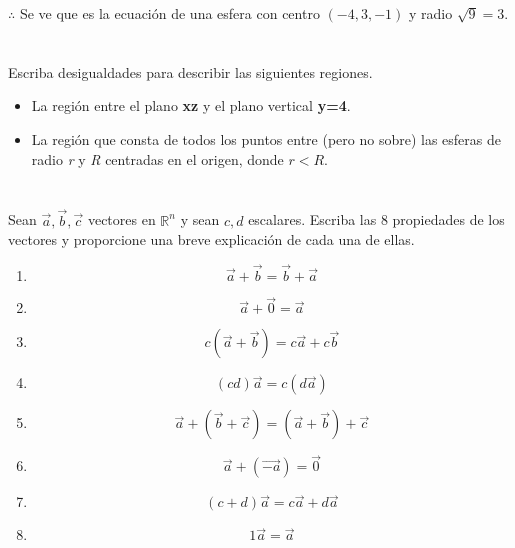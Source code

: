 \documentclass[12pt]{article}
\begin{document}
$\therefore $ Se ve que es la ecuación de una esfera con centro $(-4, 3, -1)$ y radio $\sqrt{9} = 3$.

\section{}

Escriba desigualdades para describir las siguientes regiones.

\begin{itemize}
    
\item La región entre el plano \textbf{xz} y el plano vertical \textbf{y=4}.
    
\item La región que consta de todos los puntos entre (pero no sobre) las esferas de radio \textit{r} y \textit{R} centradas en el origen, donde $r < R$.
    
\end{itemize}
  
\section{}

Sean $\vec{a} , \vec{b} , \vec{c}$ vectores en $\mathbb{R}^n$ y sean $c,d$ escalares. Escriba las 8 propiedades de los vectores y proporcione una breve explicación de cada una de ellas.

\begin{enumerate}

\item $$\vec{a}+\vec{b} = \vec{b}+\vec{a}$$

\item $$\vec{a}+\vec{0} = \vec{a}$$

\item $$c(\vec{a}+\vec{b}) = c\vec{a}+c\vec{b}$$

\item $$(cd)\vec{a} = c(d\vec{a})$$

\item $$\vec{a}+(\vec{b}+\vec{c}) = (\vec{a}+\vec{b})+\vec{c}$$

\item $$\vec{a}+(\vec{-a}) = \vec{0}$$

\item $$(c+d)\vec{a} = c\vec{a}+d\vec{a}$$

\item $$1\vec{a} = \vec{a}$$

\end{enumerate}
\end{document}
